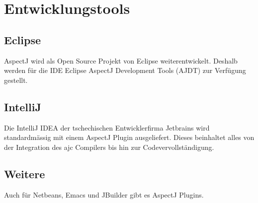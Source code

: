 \section{Entwicklungstools}
\subsection{Eclipse}
AspectJ wird als Open Source Projekt von Eclipse weiterentwickelt. Deshalb werden für die IDE Eclipse AspectJ Development Tools (AJDT) zur Verfügung gestellt. \cite{eclipse:ajdt}
\subsection{IntelliJ}
Die IntelliJ IDEA der tschechischen Entwicklerfirma Jetbrains wird standardmässig mit einem AspectJ Plugin ausgeliefert. Dieses beinhaltet alles von der Integration des ajc Compilers bis hin zur Codevervollständigung.
\subsection{Weitere}
Auch für Netbeans, Emacs und JBuilder gibt es AspectJ Plugins.